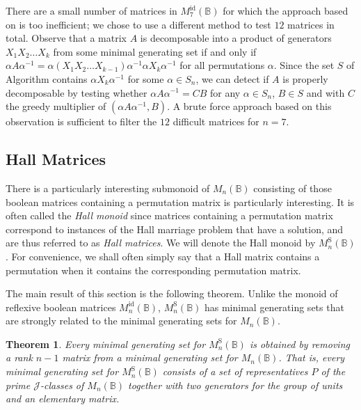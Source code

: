 \documentclass[11pt]{article}
\newtheorem{thm}{Theorem}[section]
\numberwithin{equation}{section}
\newcommand{\B}{\mathbb{B}}
\newcommand{\Bn}{M_n(\B)}
\newcommand{\Refn}{M_n^{\text{id}}(\B)}
\newcommand{\Ref}[1]{M_{#1}^{\text{id}}(\B)}
\newcommand{\Halln}{M_n^{\text{S}}(\B)}
\newcommand{\J}{\mathscr{J}}
\begin{document}
There are a small number of matrices in $\Ref{7}$ for which the approach based on
 is too inefficient; we chose to use a
different method to test $12$ matrices in total. Observe that a matrix $A$ is
decomposable into a product of generators $X_1 X_2 \ldots X_k$ from some minimal
generating set if and only if $\alpha A \alpha^{-1} = \alpha (X_1 X_2 \ldots
X_{k-1})\alpha^{-1}\alpha X_k \alpha^{-1}$ for all permutations $\alpha$. Since
the set $S$ of Algorithm  contains $\alpha X_k
\alpha^{-1}$ for some $\alpha \in S_n$, we can detect if $A$ is properly
decomposable by testing whether $\alpha A \alpha^{-1} = CB$ for any $\alpha \in
S_n$, $B \in S$ and with $C$ the greedy multiplier of $(\alpha A \alpha^{-1},
B)$. A brute force approach based on this observation is sufficient to filter
the $12$ difficult matrices for $n = 7$.


\subsection{Hall Matrices}
\label{sec:HallBoolMat}


There is a particularly interesting submonoid of $\Bn$ consisting of those
boolean matrices containing a permutation matrix is particularly interesting. It
is often called the \emph{Hall monoid} since matrices containing a permutation
matrix correspond to instances of the Hall marriage problem that have a
solution, and are thus referred to as \emph{Hall matrices}. We will denote the
Hall monoid by $\Halln$. For convenience, we shall often simply say that a Hall
matrix contains a permutation when it contains the corresponding permutation
matrix.

The main result of this section is the following theorem.  Unlike the monoid of
reflexive boolean matrices $\Refn$, $\Halln$ has minimal generating sets that
are strongly related to the minimal generating sets for $\Bn$.
\begin{thm}
  Every minimal generating set for $\Halln$ is obtained by removing a rank $n-1$
  matrix from a minimal generating set for $\Bn$. That is, every minimal
  generating set for $\Halln$ consists of a set of representatives $P$ of the
  prime $\J$-classes of $\Bn$ together with two generators for the group of units
  and an elementary matrix.
\end{thm}
\end{document}

